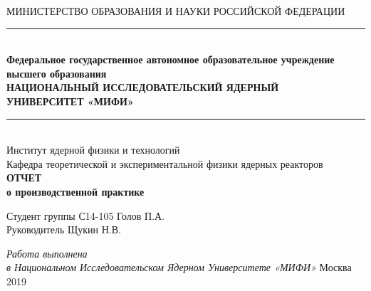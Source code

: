 \begin{titlepage}
	\begin{center} 
		\small МИНИСТЕРСТВО ОБРАЗОВАНИЯ И НАУКИ РОССИЙСКОЙ ФЕДЕРАЦИИ\\
		\noindent\rule{13.9cm}{0.4pt}\\
		\textbf{\footnotesize Федеральное государственное автономное образовательное учреждение высшего образования}\\[0.3cm]
		\textbf{\normalsize НАЦИОНАЛЬНЫЙ ИССЛЕДОВАТЕЛЬСКИЙ ЯДЕРНЫЙ \\УНИВЕРСИТЕТ «МИФИ»}\\
		\noindent\rule{13.9cm}{0.4pt}\\[0.6cm]

		\normalsize Институт ядерной физики и технологий\\[0.6cm]
		Кафедра теоретической и экспериментальной физики ядерных реакторов\\[2.4cm]

		\textbf{\LARGE ОТЧЕТ}\\[0.6cm]
		\textbf{\large о производственной практике}\\[3.6cm]
	\end{center} 

	\normalsize
	Студент группы С14-105 \hspace{2.1cm} \underline{\hspace{4.2cm}} Голов П.А.\\[0.6cm]

	Руководитель \hspace{4.5cm} \underline{\hspace{4.2cm}} Щукин Н.В.\\[1.2cm]

	\begin{center} 
		\textit{Работа выполнена\\
		в Национальном Исследовательском Ядерном Университете «МИФИ»}
		\vfill 
		\large Москва 2019
	\end{center} 

	\thispagestyle{empty}
\end{titlepage}
